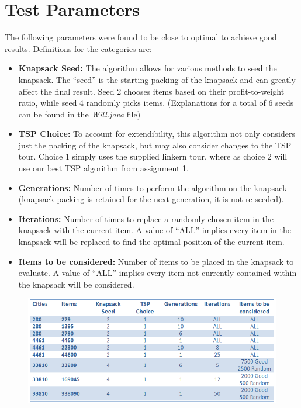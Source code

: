 \documentclass[a4paper,12pt]{article}
\begin{document}
\section{Test Parameters}
The following parameters were found to be close to optimal to achieve good results. Definitions for the categories are:
\begin{itemize}
	\item {\bf Knapsack Seed:} The algorithm allows for various methods to seed the knapsack. The ``seed'' is the starting packing of the knapsack and can greatly affect the final result. Seed 2 chooses items based on their profit-to-weight ratio, while seed 4 randomly picks items. (Explanations for a total of 6 seeds can be found in the \textit{Will.java} file)
	\item {\bf TSP Choice:} To account for extendibility, this algorithm not only considers just the packing of the knapsack, but may also consider changes to the TSP tour. Choice 1 simply uses the supplied linkern tour, where as choice 2 will use our best TSP algorithm from assignment 1.
	\item {\bf Generations:} Number of times to perform the algorithm on the knapsack (knapsack packing is retained for the next generation, it is not re-seeded).
	\item {\bf Iterations:} Number of times to replace a randomly chosen item in the knapsack with the current item. A value of ``ALL'' implies every item in the knapsack will be replaced to find the optimal position of the current item.
	\item {\bf Items to be considered:} Number of items to be placed in the knapsack to evaluate. A value of ``ALL'' implies every item not currently contained within the knapsack will be considered.
\end{itemize}

\begin{figure}[h]
\centering
\includegraphics[width=\linewidth]{ParamsTable.png}
\end{figure}
\end{document}
